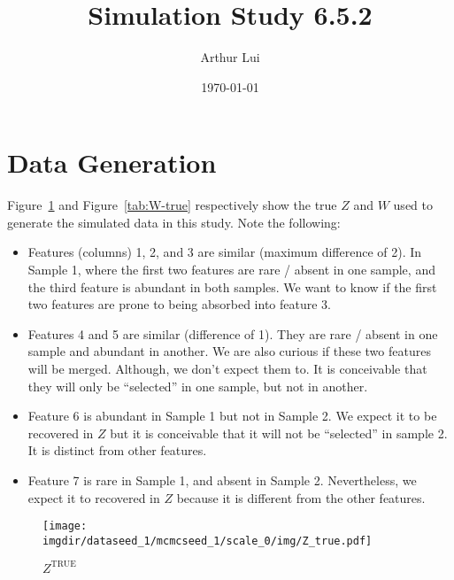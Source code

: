 \documentclass[10pt]{article} %
\title{Simulation Study 6.5.2}
\author{Arthur Lui}
\date{\today} %
\def\true{\text{TRUE}}
\def\imgdir{../../results/test-sim-6-5-2/}
\begin{document}
\maketitle



\section{Data Generation}\label{sec:data-generation}
Figure~\ref{fig:Z-true} and Figure~\ref{tab:W-true} respectively show the true
$Z$ and $W$ used to generate the simulated data in this study. Note the following:
\begin{itemize}
  \item Features (columns) 1, 2, and 3 are similar (maximum difference of 2).
    In Sample 1, where the first two features are rare / absent in one
    sample, and the third feature is abundant in both samples. We want to know
    if the first two features are prone to being absorbed into feature 3.
  \item Features 4 and 5 are similar (difference of 1). They are rare / absent
    in one sample and abundant in another. We are also curious if these two 
    features will be merged. Although, we don't expect them to. It is conceivable
    that they will only be ``selected'' in one sample, but not in another.
  \item Feature 6 is abundant in Sample 1 but not in Sample 2. We expect it to be
    recovered in $Z$ but it is conceivable that it will not be ``selected'' in sample
    2. It is distinct from other features.
  \item Feature 7 is rare in Sample 1, and absent in Sample 2. Nevertheless, we
    expect it to recovered in $Z$ because it is different from the other
    features.
\end{itemize}

\begin{figure}[H]
  \begin{center}  %
    \texttt{[image: \\imgdir/dataseed\_1/mcmcseed\_1/scale\_0/img/Z\_true.pdf]}
  \end{center}
  \caption{$Z^\true$}
  \label{fig:Z-true}
\end{figure}
\end{document}
